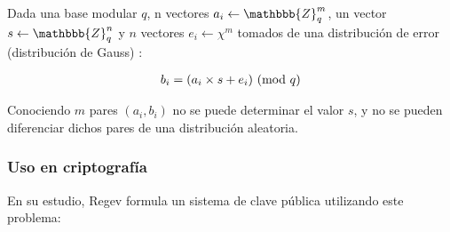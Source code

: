 Dada una base modular $q$, n vectores $a_i \leftarrow \mathbbb{Z}^m_q$, un vector $s \leftarrow \mathbbb{Z}^n_q$ y $n$ vectores $ e_i \leftarrow \chi{}^m $ tomados de una distribución de error (distribución de Gauss\cite{noauthor_generalized_2019}) \chi{} \subset{} :

\begin{gather}
    \label{form:gen_lwe}
    b_i = (a_i \times s + e_i) \ (\mathrm{mod}\ q)
\end{gather}

Conociendo $m$ pares $(a_i, b_i)$ no se puede determinar el valor $s$, y no se pueden diferenciar dichos pares de una distribución aleatoria\cite{t._zijlstra_learning_nodate}.

\subsubsection{Uso en criptografía}

En su estudio, Regev\cite{regev_learning_2010} formula un sistema de clave pública utilizando este problema:

